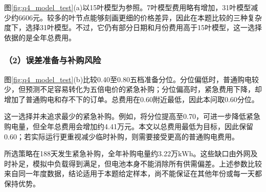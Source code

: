 图\ref{fig:q4_model_test}(a)以15叶模型为参照。7叶模型费用略有增加，31叶模型减少约6606元。较多的叶节点能够刻画更细的价格差异，因此在本题比较的三种复杂度下，选择31叶模型。不过，它仍有部分日期和月份费用高于15叶模型，这一选择依据的是全年总费用。

\subsubsection*{（2）误差准备与补购风险}

图\ref{fig:q4_model_test}(b)比较0.40至0.80五档准备分位。分位偏低时，普通购电较少，但预测不足容易转化为五倍电价的紧急补购；分位偏高时，紧急费用下降，却增加了普通购电和存不下的订单。总费用在0.60附近最低，因此本问取0.60分位。

这一选择并未追求最少的紧急补购。例如，将分位提高至0.70，可进一步降低紧急购电量，但全年总费用会增加约4.41万元。本文以总费用最低为目标，因此保留0.60；若实际运行更重视减少临时补购，则需要接受更高的普通购电费用。

所选策略在188天发生紧急补购，全年补购电量约3.22万$\mathrm{kWh}$。这些缺口由外网及时补足，模拟中负载得到满足，但电池本身不能消除所有供需偏差。上述参数比较来自同一年度数据，结论适用于本题给定样本，尚不能保证在其他年份或每一天都保持优势。
